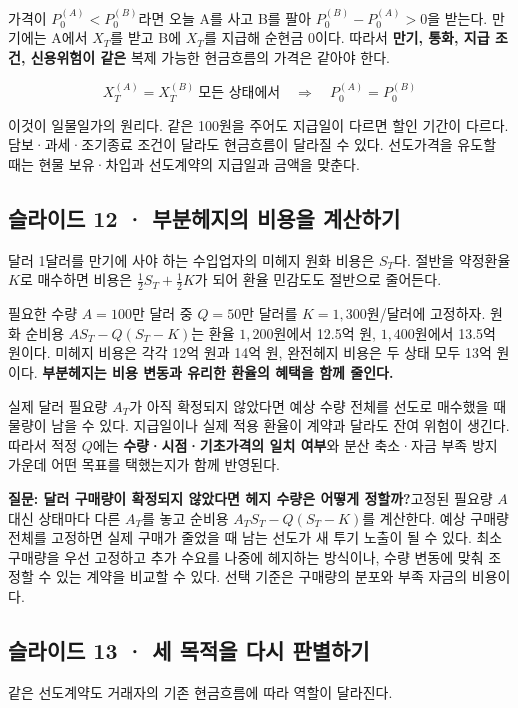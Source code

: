 \documentclass[11pt,a4paper]{article}
\begin{document}
가격이 $P_0^{(A)}<P_0^{(B)}$라면 오늘 A를 사고 B를 팔아 $P_0^{(B)}-P_0^{(A)}>0$을 받는다. 만기에는 A에서 $X_T$를 받고 B에 $X_T$를 지급해 순현금 0이다. 따라서 \textbf{만기, 통화, 지급 조건, 신용위험이 같은} 복제 가능한 현금흐름의 가격은 같아야 한다.\par

\[
X_T^{(A)}=X_T^{(B)}\ \text{모든 상태에서}\quad\Longrightarrow\quad P_0^{(A)}=P_0^{(B)}
\]

이것이 일물일가의 원리다. 같은 100원을 주어도 지급일이 다르면 할인 기간이 다르다. 담보·과세·조기종료 조건이 달라도 현금흐름이 달라질 수 있다. 선도가격을 유도할 때는 현물 보유·차입과 선도계약의 지급일과 금액을 맞춘다.\par

\subsection{슬라이드 12 · 부분헤지의 비용을 계산하기}
달러 1달러를 만기에 사야 하는 수입업자의 미헤지 원화 비용은 $S_T$다. 절반을 약정환율 $K$로 매수하면 비용은 $\tfrac12S_T+\tfrac12K$가 되어 환율 민감도도 절반으로 줄어든다.\par

필요한 수량 $A=100$만 달러 중 $Q=50$만 달러를 $K=1{,}300$원/달러에 고정하자. 원화 순비용 $AS_T-Q(S_T-K)$는 환율 $1{,}200$원에서 12.5억 원, $1{,}400$원에서 13.5억 원이다. 미헤지 비용은 각각 12억 원과 14억 원, 완전헤지 비용은 두 상태 모두 13억 원이다. \textbf{부분헤지는 비용 변동과 유리한 환율의 혜택을 함께 줄인다.}\par

실제 달러 필요량 $A_T$가 아직 확정되지 않았다면 예상 수량 전체를 선도로 매수했을 때 물량이 남을 수 있다. 지급일이나 실제 적용 환율이 계약과 달라도 잔여 위험이 생긴다. 따라서 적정 $Q$에는 \textbf{수량·시점·기초가격의 일치 여부}와 분산 축소·자금 부족 방지 가운데 어떤 목표를 택했는지가 함께 반영된다.\par

\par\medskip\noindent\textbf{질문: 달러 구매량이 확정되지 않았다면 헤지 수량은 어떻게 정할까?}\quad 고정된 필요량 $A$ 대신 상태마다 다른 $A_T$를 놓고 순비용 $A_TS_T-Q(S_T-K)$를 계산한다. 예상 구매량 전체를 고정하면 실제 구매가 줄었을 때 남는 선도가 새 투기 노출이 될 수 있다. 최소 구매량을 우선 고정하고 추가 수요를 나중에 헤지하는 방식이나, 수량 변동에 맞춰 조정할 수 있는 계약을 비교할 수 있다. 선택 기준은 구매량의 분포와 부족 자금의 비용이다.\par

\subsection{슬라이드 13 · 세 목적을 다시 판별하기}
같은 선도계약도 거래자의 기존 현금흐름에 따라 역할이 달라진다.\par
\end{document}
